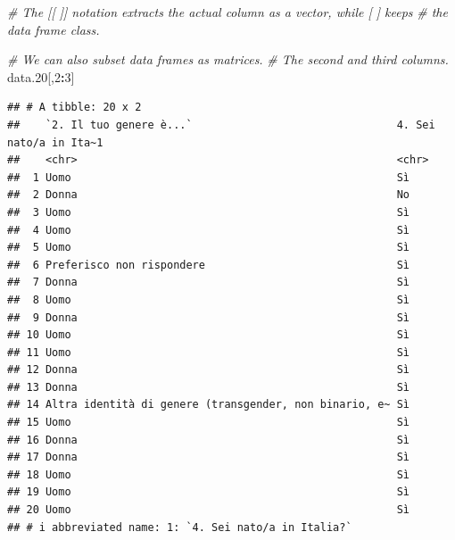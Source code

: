 \documentclass[
]{book}
\newenvironment{Shaded}{\begin{snugshade}}{\end{snugshade}}
\newcommand{\CommentTok}[1]{\textcolor[rgb]{0.56,0.35,0.01}{\textit{#1}}}
\newcommand{\DecValTok}[1]{\textcolor[rgb]{0.00,0.00,0.81}{#1}}
\newcommand{\FloatTok}[1]{\textcolor[rgb]{0.00,0.00,0.81}{#1}}
\newcommand{\NormalTok}[1]{#1}
\newcommand{\SpecialCharTok}[1]{\textcolor[rgb]{0.81,0.36,0.00}{\textbf{#1}}}
\begin{document}
\begin{Shaded}
\begin{Highlighting}[]
\CommentTok{\# The [[ ]] notation extracts the actual column as a vector, while [ ] keeps}
\CommentTok{\# the data frame class.}

\CommentTok{\# We can also subset data frames as matrices.}
\CommentTok{\# The second and third columns.}
\NormalTok{data}\FloatTok{.20}\NormalTok{[,}\DecValTok{2}\SpecialCharTok{:}\DecValTok{3}\NormalTok{]}
\end{Highlighting}
\end{Shaded}

\begin{verbatim}
## # A tibble: 20 x 2
##    `2. Il tuo genere è...`                                4. Sei nato/a in Ita~1
##    <chr>                                                  <chr>                 
##  1 Uomo                                                   Sì                    
##  2 Donna                                                  No                    
##  3 Uomo                                                   Sì                    
##  4 Uomo                                                   Sì                    
##  5 Uomo                                                   Sì                    
##  6 Preferisco non rispondere                              Sì                    
##  7 Donna                                                  Sì                    
##  8 Uomo                                                   Sì                    
##  9 Donna                                                  Sì                    
## 10 Uomo                                                   Sì                    
## 11 Uomo                                                   Sì                    
## 12 Donna                                                  Sì                    
## 13 Donna                                                  Sì                    
## 14 Altra identità di genere (transgender, non binario, e~ Sì                    
## 15 Uomo                                                   Sì                    
## 16 Donna                                                  Sì                    
## 17 Donna                                                  Sì                    
## 18 Uomo                                                   Sì                    
## 19 Uomo                                                   Sì                    
## 20 Uomo                                                   Sì                    
## # i abbreviated name: 1: `4. Sei nato/a in Italia?`
\end{verbatim}
\end{document}
